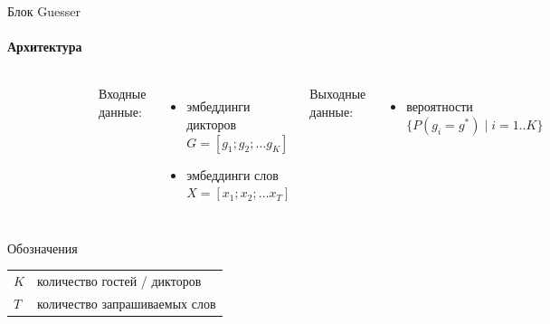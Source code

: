 \documentclass{beamer}
\begin{document}
\begin{frame}{Блок Guesser}
\framesubtitle{Архитектура}
    \begin{columns}
    
    \begin{figure}[bht]
    \includegraphics[width=.9\textwidth]{guesser.png}
    \end{figure}

    Входные данные:
    \begin{itemize}
        \item эмбеддинги дикторов\\
            $G = [g_1; g_2; \ldots g_K]$
        \item эмбеддинги слов\\
            $X = [x_1; x_2; \ldots x_T]$
    \end{itemize}
    Выходные данные:
    \begin{itemize}
        \item вероятности
            $\{P(g_i = g^*) \;|\; i=1..K\}$
    \end{itemize}
    
    \end{columns}

    \begin{block}{Обозначения}
    \begin{tabular}{l l}
        $K$ & количество гостей / дикторов\\
        $T$ & количество запрашиваемых слов
    \end{tabular}
    \end{block}
\end{frame}
\end{document}
